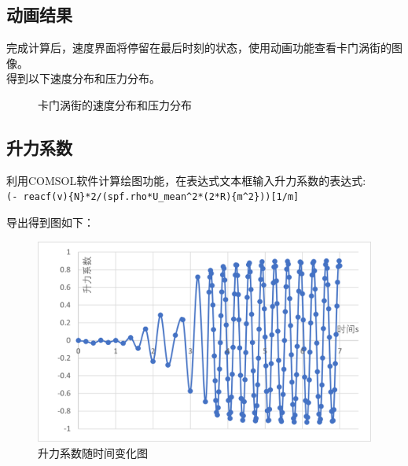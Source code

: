 \documentclass[a4paper,zihao=5,UTF8,fontset=fandol]{phyreport}
\begin{document}
\subsection{动画结果}
完成计算后，速度界面将停留在最后时刻的状态，使用动画功能查看卡门涡街的图像。\\
得到以下速度分布和压力分布。
\begin{figure}[h!]
  \centering
  \caption{卡门涡街的速度分布和压力分布}
\end{figure}

\subsection{升力系数}
利用COMSOL软件计算绘图功能，在表达式文本框输入升力系数的表达式:\\\texttt{(- reacf(v)\{N\}*2/(spf.rho*U\_mean\textasciicircum2*(2*R)\{m\textasciicircum2\}))[1/m]}

导出得到图如下：
\begin{figure}[h!]
  \centering
  \includegraphics[width=0.7\linewidth]{升力系数.png}
  \caption{升力系数随时间变化图}
\end{figure}
\end{document}
